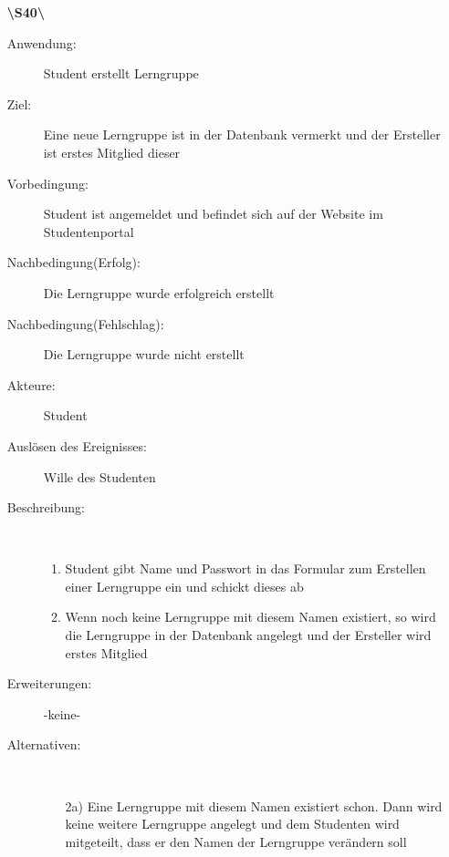 \documentclass[parskip=full]{scrartcl}
\begin{document}
\begin{enumerate}
  \item[\textbf{\textbackslash S40\textbackslash}] \begin{description}
  \item[Anwendung:] Student erstellt Lerngruppe
  \item[Ziel:] Eine neue Lerngruppe ist in der Datenbank vermerkt und der Ersteller ist erstes Mitglied dieser
  	\item[Vorbedingung:] Student ist angemeldet und befindet sich auf der Website im Studentenportal
  	\item[Nachbedingung(Erfolg):] Die Lerngruppe wurde erfolgreich erstellt
  	\item[Nachbedingung(Fehlschlag):] Die Lerngruppe wurde nicht erstellt
  	\item[Akteure:] Student
  	\item[Auslösen des Ereignisses:] Wille des Studenten
  	\item[Beschreibung:]~
  	\begin{enumerate}[1.]
  	  \item Student gibt Name und Passwort in das Formular zum Erstellen einer
  	  Lerngruppe ein und schickt dieses ab
  	  \item Wenn noch keine Lerngruppe mit diesem Namen existiert, so wird die
  	  Lerngruppe in der Datenbank angelegt und der Ersteller wird erstes Mitglied
  	\end{enumerate}
  	\item[Erweiterungen:] -keine-
  	\item[Alternativen:] ~
  	\begin{enumerate}
  	  \item[2a)] Eine Lerngruppe mit diesem Namen existiert schon. Dann wird
  	  keine weitere Lerngruppe angelegt und dem Studenten wird mitgeteilt, dass er den Namen der Lerngruppe verändern soll
  	 \end{enumerate}  
  \end{description}
  \pagebreak
  

\end{enumerate}
\end{document}

